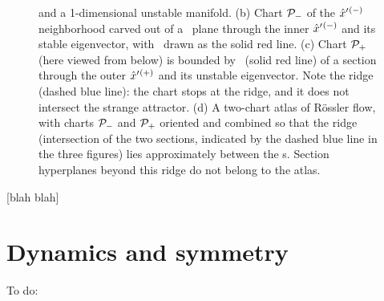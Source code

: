\documentclass[aip,cha,reprint,
secnumarabic,
nofootinbib, tightenlines,
nobibnotes, showkeys, showpacs,
groupedaddress
]{revtex4-1}
\begin{document}
\begin{figure}
{  and a 1-dimensional unstable manifold.
(b)
 Chart ${\cal P}_{-}$ of the ${\hat{x}'}{}^{(-)}$ neighborhood carved out of a
 \PoincSec\ plane through the inner {\eqv} ${\hat{x}'}{}^{(-)}$ and its
 stable eigenvector, with \poincBord\ drawn as the solid red line.
(c)
  Chart ${\cal P}_{+}$ (here viewed from below) is bounded by \poincBord\
  (solid red line) of a section through the outer {\eqv}
  ${\hat{x}'}{}^{(+)}$  and its unstable eigenvector.  Note the ridge
  (dashed blue line): the chart stops at the ridge, and it does not
  intersect the strange attractor.
(d)
  A two-chart atlas of R\"ossler flow, with charts ${\cal P}_{-}$ and
  ${\cal P}_{+}$ oriented and combined so that the ridge (intersection of
  the two sections, indicated by the dashed blue line in the three
  figures) lies approximately between the \template s. Section
  hyperplanes beyond this ridge do not belong to the atlas.
    }
\label{fig:RoessTrjs}
\end{figure}

 [blah blah]

\section{Dynamics and symmetry}
\label{s:symm}
To do:
\end{document}
